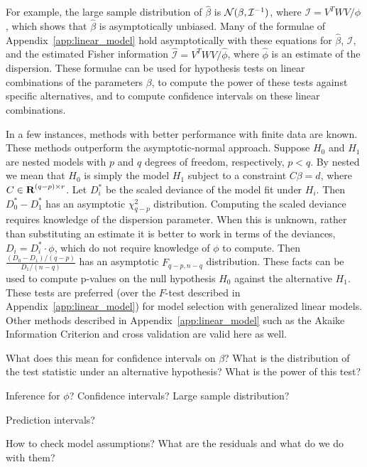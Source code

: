 \documentclass[12pt]{article}
\begin{document}
For example, the large sample distribution of $\hat{\beta}$ is ${\mathcal N}(\beta,  \mathcal{I}^{-1})$, where $\mathcal{I} = V^T W V / \phi$, which shows that $\hat{\beta}$ is asymptotically unbiased. Many of the formulae of Appendix~\ref{app:linear_model} hold asymptotically with these equations for $\hat{\beta}$, $\mathcal{I}$, and the estimated Fisher information $\hat{\mathcal{I}} = V^T W V / \hat{\phi}$, where $\hat{\phi}$ is an estimate of the dispersion. These formulae can be used for hypothesis tests on linear combinations of the parameters $\beta$, to compute the power of these tests against specific alternatives, and to compute confidence intervals on these linear combinations.

In a few instances, methods with better performance with finite data are known. These methods outperform the asymptotic-normal approach. Suppose $H_0$ and $H_1$ are nested models with $p$ and $q$ degrees of freedom, respectively, $p < q$. By nested we mean that $H_0$ is simply the model $H_1$ subject to a constraint $C \beta = d$, where $C \in {\mbox{\bf R}}^{(q-p)\times r}$. Let $D_i^*$ be the scaled deviance of the model fit under $H_i$. Then $D_0^* - D_1^*$ has an asymptotic $\chi_{q-p}^2$ distribution. Computing the scaled deviance requires knowledge of the dispersion parameter. When this is unknown, rather than substituting an estimate it is better to work in terms of the deviances, $D_i = D_i^* \cdot \phi$, which do not require knowledge of $\phi$ to compute. Then $\frac{(D_0 - D_1) / (q-p)}{D_1 / (n - q)}$ has an asymptotic $F_{q-p, n-q}$ distribution. These facts can be used to compute p-values on the null hypothesis $H_0$ against the alternative $H_1$. These tests are preferred (over the $F$-test described in Appendix~\ref{app:linear_model}) for model selection with generalized linear models. Other methods described in Appendix~\ref{app:linear_model} such as the Akaike Information Criterion and cross validation are valid here as well.

What does this mean for confidence intervals on $\beta$? What is the distribution of the test statistic under an alternative hypothesis? What is the power of this test?

Inference for $\phi$? Confidence intervals? Large sample distribution? 

Prediction intervals?

How to check model assumptions? What are the residuals and what do we do with them?


\newpage

\end{document}
